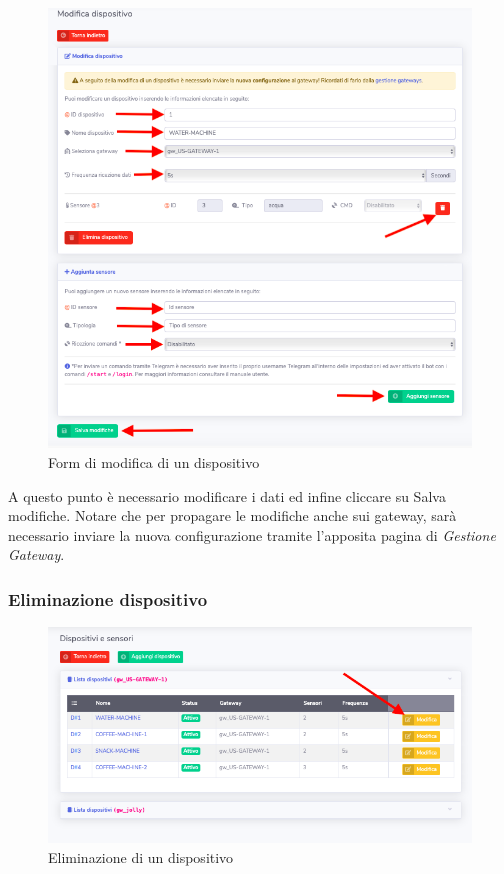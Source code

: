 		\begin{figure}[H]
		\centering
		\includegraphics[scale=0.600]{res/images/admin/modDispositivo.png}
		\caption{Form di modifica di un dispositivo}
	\end{figure}

		A questo punto è necessario modificare i dati ed infine cliccare su Salva modifiche. 
		Notare che per propagare le modifiche anche sui gateway, sarà necessario inviare la nuova configurazione tramite l'apposita pagina di \textit{Gestione Gateway}.

	\subsubsection{Eliminazione dispositivo}	

		\begin{figure}[H]
		\centering
		\includegraphics[scale=0.600]{res/images/admin/selModDisp.png}
		\caption{Eliminazione di un dispositivo}
	\end{figure}



